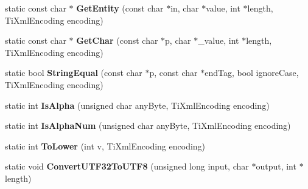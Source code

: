 \begin{DoxyCompactItemize}
\item 
static const char $\ast$ {\bfseries Get\+Entity} (const char $\ast$in, char $\ast$value, int $\ast$length, Ti\+Xml\+Encoding encoding)\hypertarget{class_ti_xml_base_ac5c08bf3deffcda0bf8ce2958372b584}{}\label{class_ti_xml_base_ac5c08bf3deffcda0bf8ce2958372b584}

\item 
static const char $\ast$ {\bfseries Get\+Char} (const char $\ast$p, char $\ast$\+\_\+value, int $\ast$length, Ti\+Xml\+Encoding encoding)\hypertarget{class_ti_xml_base_a5b0fde72d6f662ae1fd6303195d2159b}{}\label{class_ti_xml_base_a5b0fde72d6f662ae1fd6303195d2159b}

\item 
static bool {\bfseries String\+Equal} (const char $\ast$p, const char $\ast$end\+Tag, bool ignore\+Case, Ti\+Xml\+Encoding encoding)\hypertarget{class_ti_xml_base_a51631e6986179558b9e5850723ed165a}{}\label{class_ti_xml_base_a51631e6986179558b9e5850723ed165a}

\item 
static int {\bfseries Is\+Alpha} (unsigned char any\+Byte, Ti\+Xml\+Encoding encoding)\hypertarget{class_ti_xml_base_ae22522b2e8e1ac43102d16394f639fc8}{}\label{class_ti_xml_base_ae22522b2e8e1ac43102d16394f639fc8}

\item 
static int {\bfseries Is\+Alpha\+Num} (unsigned char any\+Byte, Ti\+Xml\+Encoding encoding)\hypertarget{class_ti_xml_base_a321919055c115c78ded17f85a793f368}{}\label{class_ti_xml_base_a321919055c115c78ded17f85a793f368}

\item 
static int {\bfseries To\+Lower} (int v, Ti\+Xml\+Encoding encoding)\hypertarget{class_ti_xml_base_a799f17405a86a5c2029618e85f11a097}{}\label{class_ti_xml_base_a799f17405a86a5c2029618e85f11a097}

\item 
static void {\bfseries Convert\+U\+T\+F32\+To\+U\+T\+F8} (unsigned long input, char $\ast$output, int $\ast$length)\hypertarget{class_ti_xml_base_a07c765e3a7f979d343e646ea797b180b}{}\label{class_ti_xml_base_a07c765e3a7f979d343e646ea797b180b}

\end{DoxyCompactItemize}
